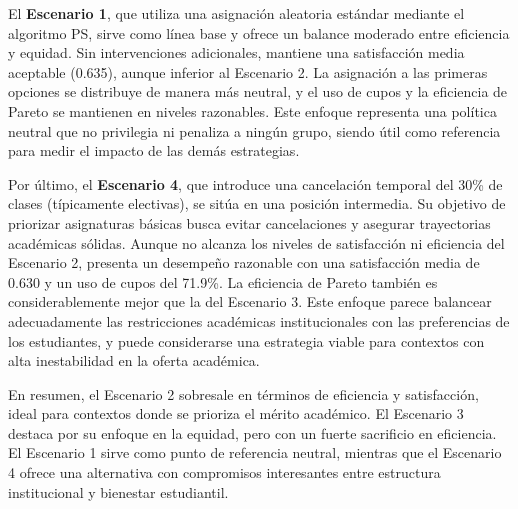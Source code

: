 \documentclass{article}
\begin{document}
El \textbf{Escenario 1}, que utiliza una asignación aleatoria estándar mediante el algoritmo PS, sirve como línea base y ofrece un balance moderado entre eficiencia y equidad. Sin intervenciones adicionales, mantiene una satisfacción media aceptable (0.635), aunque inferior al Escenario 2. La asignación a las primeras opciones se distribuye de manera más neutral, y el uso de cupos y la eficiencia de Pareto se mantienen en niveles razonables. Este enfoque representa una política neutral que no privilegia ni penaliza a ningún grupo, siendo útil como referencia para medir el impacto de las demás estrategias.

Por último, el \textbf{Escenario 4}, que introduce una cancelación temporal del 30\% de clases (típicamente electivas), se sitúa en una posición intermedia. Su objetivo de priorizar asignaturas básicas busca evitar cancelaciones y asegurar trayectorias académicas sólidas. Aunque no alcanza los niveles de satisfacción ni eficiencia del Escenario 2, presenta un desempeño razonable con una satisfacción media de 0.630 y un uso de cupos del 71.9\%. La eficiencia de Pareto también es considerablemente mejor que la del Escenario 3. Este enfoque parece balancear adecuadamente las restricciones académicas institucionales con las preferencias de los estudiantes, y puede considerarse una estrategia viable para contextos con alta inestabilidad en la oferta académica.

En resumen, el Escenario 2 sobresale en términos de eficiencia y satisfacción, ideal para contextos donde se prioriza el mérito académico. El Escenario 3 destaca por su enfoque en la equidad, pero con un fuerte sacrificio en eficiencia. El Escenario 1 sirve como punto de referencia neutral, mientras que el Escenario 4 ofrece una alternativa con compromisos interesantes entre estructura institucional y bienestar estudiantil.
\end{document}
